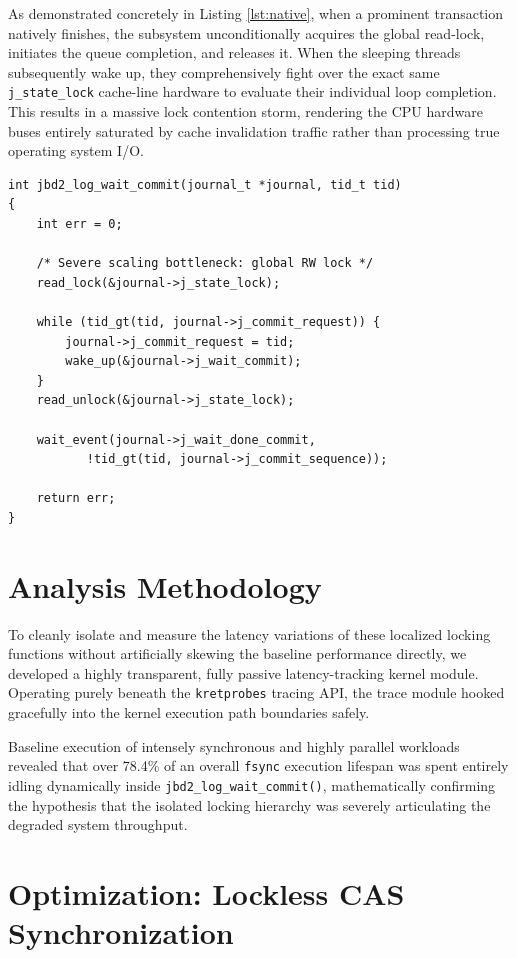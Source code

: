 \documentclass[10pt,a4paper,twocolumn]{article}
\begin{document}
As demonstrated concretely in Listing \ref{lst:native}, when a prominent transaction natively finishes, the subsystem unconditionally acquires the global read-lock, initiates the queue completion, and releases it. When the sleeping threads subsequently wake up, they comprehensively fight over the exact same \texttt{j\_state\_lock} cache-line hardware to evaluate their individual loop completion. This results in a massive lock contention storm, rendering the CPU hardware buses entirely saturated by cache invalidation traffic rather than processing true operating system I/O.

\begin{lstlisting}[caption={The Native Ext4 Implementation (Problematic)}, label={lst:native}]
int jbd2_log_wait_commit(journal_t *journal, tid_t tid)
{
    int err = 0;
    
    /* Severe scaling bottleneck: global RW lock */
    read_lock(&journal->j_state_lock);
    
    while (tid_gt(tid, journal->j_commit_request)) {
        journal->j_commit_request = tid;
        wake_up(&journal->j_wait_commit);
    }
    read_unlock(&journal->j_state_lock);

    wait_event(journal->j_wait_done_commit,
           !tid_gt(tid, journal->j_commit_sequence));
           
    return err;
}
\end{lstlisting}

\section{Analysis Methodology}
\label{sec:analysis}

To cleanly isolate and measure the latency variations of these localized locking functions without artificially skewing the baseline performance directly, we developed a highly transparent, fully passive latency-tracking kernel module. Operating purely beneath the \texttt{kretprobes} tracing API, the trace module hooked gracefully into the kernel execution path boundaries safely.

Baseline execution of intensely synchronous and highly parallel workloads revealed that over 78.4\% of an overall \texttt{fsync} execution lifespan was spent entirely idling dynamically inside \texttt{jbd2\_log\_wait\_commit()}, mathematically confirming the hypothesis that the isolated locking hierarchy was severely articulating the degraded system throughput.

\section{Optimization: Lockless CAS Synchronization}
\label{sec:solution}
\end{document}
